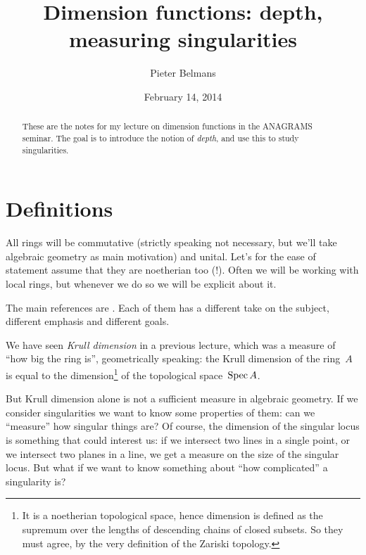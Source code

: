 \documentclass[10pt,a4paper]{article}
\title{Dimension functions: depth, measuring singularities}
\author{Pieter Belmans}
\date{February 14, 2014}
\begin{document}
\maketitle

\begin{abstract}
  These are the notes for my lecture on dimension functions in the ANAGRAMS seminar. The goal is to introduce the notion of \emph{depth}, and use this to study singularities.
\end{abstract}

\tableofcontents

\clearpage

\section{Definitions}
\label{section:definitions}
All rings will be commutative (strictly speaking not necessary, but we'll take algebraic geometry as main motivation) and unital. Let's for the ease of statement assume that they are noetherian too (!). Often we will be working with local rings, but whenever we do so we will be explicit about it.

The main references are \cite{sga2,eisenbud-commutative-algebra,serre-algebre-locale}. Each of them has a different take on the subject, different emphasis and different goals.

We have seen \emph{Krull dimension} in a previous lecture, which was a measure of ``how big the ring is'', geometrically speaking: the Krull dimension of the ring~$A$ is equal to the dimension\footnote{It is a noetherian topological space, hence dimension is defined as the supremum over the lengths of descending chains of closed subsets. So they must agree, by the very definition of the Zariski topology.} of the topological space~$\operatorname{Spec} A$.

But Krull dimension alone is not a sufficient measure in algebraic geometry. If we consider singularities we want to know some properties of them: can we ``measure'' how singular things are? Of course, the dimension of the singular locus is something that could interest us: if we intersect two lines in a single point, or we intersect two planes in a line, we get a measure on the size of the singular locus. But what if we want to know something about ``how complicated'' a singularity is?
\end{document}
